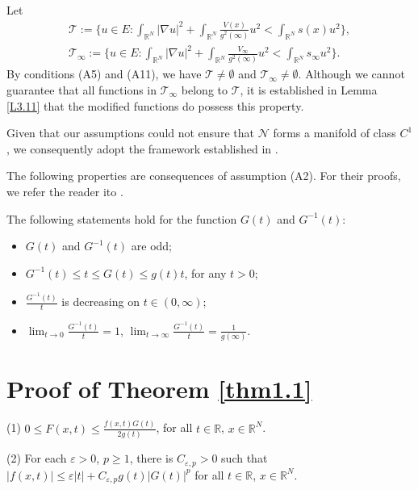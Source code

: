 \documentclass[reqno]{amsart}
\begin{document}
Let 
\begin{gather*}
\mathcal{T}:=\big\{u\in E: \int_{\mathbb{R}^N}|\nabla u|^2+\int_{\mathbb{R}^N}\frac{V(x)}{g^2(\infty)}u^2<\int_{\mathbb{R}^N}s(x)u^2\big\},\\
\mathcal{T_{\infty}}:=\big\{u\in E: \int_{\mathbb{R}^N}|\nabla u|^2+\int_{\mathbb{R}^N}\frac{V_\infty}{g^2(\infty)}u^2<\int_{\mathbb{R}^N}s_{\infty}u^2\big\}.
\end{gather*}
 By conditions (A5) and (A11), we have 
 $\mathcal{T} \neq \emptyset $ and $\mathcal{T}_\infty \neq \emptyset $. 
 Although we cannot guarantee that all functions in $\mathcal{T_{\infty}}$ belong to 
 $\mathcal{T}$, it is established in Lemma \ref{L3.11} that the modified functions do 
 possess this property.
 
Given that our assumptions could not ensure that $\mathcal{N}$  forms a manifold of 
class $C^1$, we consequently adopt the framework established in \cite{Szulkin1, Szulkin2}.
 

The following properties are consequences of assumption (A2). For their proofs, we refer the reader ito \cite{shen, deng}.

\begin{lemma}\label{L2.1} The following statements hold for the function $G(t)$ and $G^{-1}(t)$:
\begin{itemize}
  \item[(1)] $G(t)$ and $G^{-1}(t)$ are odd;
  \item[(2)]  $G^{-1}(t)\leq t\leq G(t)\leq g(t)t$, for any $t>0$;
  \item[(3)] $\frac{G^{-1}(t)}{t}$ is decreasing on $t\in(0,\infty)$;
  \item[(4)] $\lim_{t\to 0}\frac{G^{-1}(t)}{t}=1$, $\lim_{t\to \infty}\frac{G^{-1}(t)}{t}=\frac{1}{g(\infty)}$.
\end{itemize}
\end{lemma}

\section{Proof of Theorem \ref{thm1.1}}  \label{s3}

\begin{lemma}\label{L3.1} 
(1)  $0\leq F(x,t)\leq \frac{f(x,t)G(t)}{2g(t)}$, for all $t\in \mathbb{R}$, $x\in{\mathbb{R}^N}$.

(2) For each $\varepsilon >0$, $p\geq1$, there is $C_{\varepsilon, p}>0$ such that
$|f(x,t)|\leq \varepsilon |t|+C_{\varepsilon, p} g(t)|G(t)|^{p}$ for all $t\in \mathbb{R}$, $x\in{\mathbb{R}^N}$.
\end{lemma}
\end{document}
